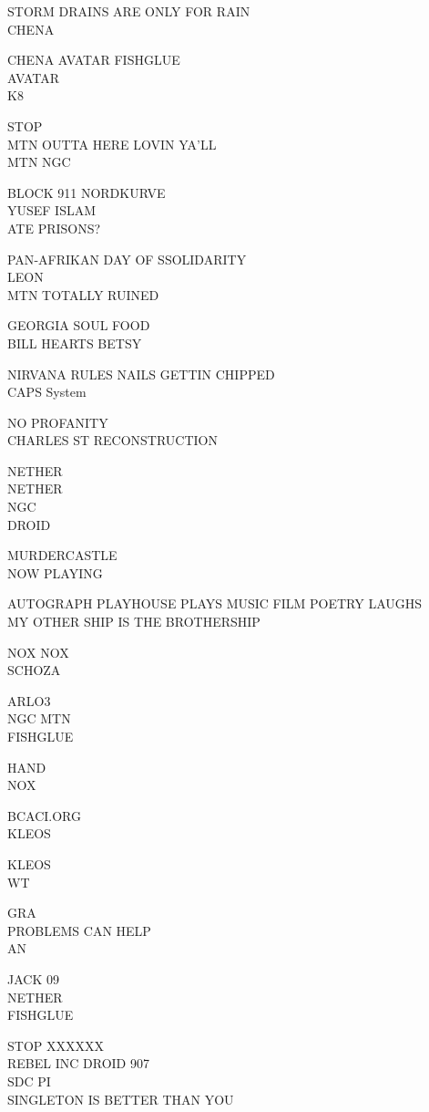 \documentclass[10pt,letterpaper]{article}
\begin{document}
STORM DRAINS ARE ONLY FOR RAIN\\
CHENA

CHENA AVATAR FISHGLUE\\
AVATAR\\
K8

STOP\\
MTN OUTTA HERE LOVIN YA'LL\\
MTN NGC

BLOCK 911 NORDKURVE\\
YUSEF ISLAM\\
ATE PRISONS?

PAN{-}AFRIKAN DAY OF SSOLIDARITY\\
LEON\\
MTN TOTALLY RUINED

GEORGIA SOUL FOOD\\
BILL HEARTS BETSY

NIRVANA RULES NAILS GETTIN CHIPPED\\
CAPS System

NO PROFANITY\\
CHARLES ST RECONSTRUCTION

NETHER\\
NETHER\\
NGC\\
DROID

MURDERCASTLE\\
NOW PLAYING

AUTOGRAPH PLAYHOUSE PLAYS MUSIC FILM POETRY LAUGHS\\
MY OTHER SHIP IS THE BROTHERSHIP

NOX NOX\\
SCHOZA

ARLO3\\
NGC MTN\\
FISHGLUE

HAND\\
NOX

BCACI.ORG\\
KLEOS

KLEOS\\
WT

GRA\\
PROBLEMS CAN HELP\\
AN

JACK 09\\
NETHER\\
FISHGLUE

STOP XXXXXX\\
REBEL INC DROID 907\\
SDC PI\\
SINGLETON IS BETTER THAN YOU
\end{document}
